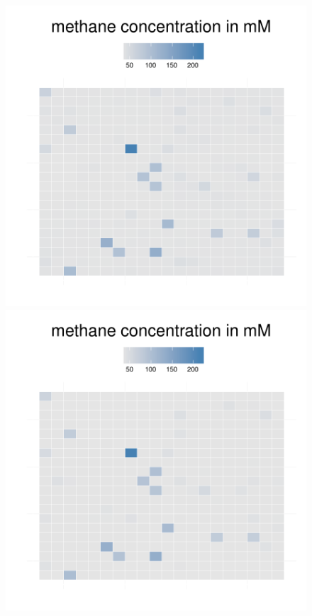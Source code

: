 \begin{figure}[h!]
{\begin{minipage}[t]{0.3\textwidth}
  \end{minipage}
  \begin{minipage}[t]{0.3\textwidth}
    \includegraphics[width=\textwidth]{../results/barkeri_20x20_seed9659_meth100.pdf}
  \end{minipage}
  \begin{minipage}[t]{0.3\textwidth}
    \includegraphics[width=\textwidth]{../results/barkeri_20x20_seed9659_meth130.pdf}

\end{minipage}}
\end{figure}

